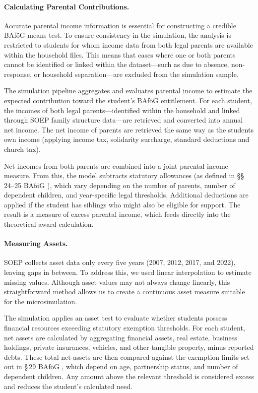 \paragraph{Calculating Parental Contributions.}
Accurate parental income information is essential for constructing a credible BAföG means test. 
To ensure consistency in the simulation, the analysis is restricted to students for whom income data from both legal parents are available within the household files. 
This means that cases where one or both parents cannot be identified or linked within the dataset—such as due to absence, non-response, or household separation—are excluded from the simulation sample.

The simulation pipeline aggregates and evaluates parental income to estimate the expected contribution toward the student’s BAföG entitlement. 
For each student, the incomes of both legal parents—identified within the household and linked through SOEP family structure data—are retrieved and converted into annual net income. 
The net income of parents are retrieved the same way as the students own income (applying income tax, solidarity surcharge, standard deductions and church tax).

Net incomes from both parents are combined into a joint parental income measure. 
From this, the model subtracts statutory allowances (as defined in §§\,24–25 BAföG \citep{bafoeg_law}), which vary depending on the number of parents, number of dependent children, and year-specific legal thresholds. 
Additional deductions are applied if the student has siblings who might also be eligible for support. 
The result is a measure of excess parental income, which feeds directly into the theoretical award calculation.


\paragraph{Measuring Assets.}
SOEP collects asset data only every five years (2007, 2012, 2017, and 2022), leaving gaps in between. 
To address this, we used linear interpolation to estimate missing values. 
Although asset values may not always change linearly, this straightforward method allows us to create a continuous asset measure suitable for the microsimulation.

The simulation applies an asset test to evaluate whether students possess financial resources exceeding statutory exemption thresholds. 
For each student, net assets are calculated by aggregating financial assets, real estate, business holdings, private insurances, vehicles, and other tangible property, minus reported debts. 
These total net assets are then compared against the exemption limits set out in §\,29 BAföG \citep{bafoeg_law}, which depend on age, partnership status, and number of dependent children. 
Any amount above the relevant threshold is considered excess and reduces the student's calculated need.


